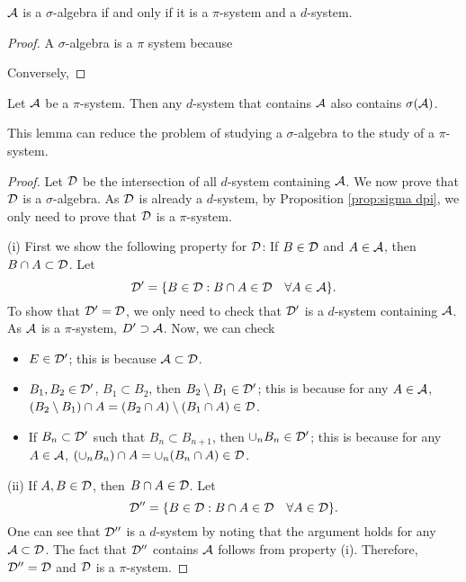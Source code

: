 \begin{proposition}\label{prop:sigma dpi}
    $\mathcal{A}$ is a $\sigma$-algebra if and only if it is a $\pi$-system and a $d$-system.
\end{proposition}
\begin{proof}
    A $\sigma$-algebra is a $\pi$ system because

    Conversely, 
\end{proof}

\begin{lemma}
    Let $\mathcal{A}$ be a $\pi$-system. Then any $d$-system that contains $\mathcal{A}$ also contains $\sigma(\mathcal{A})$.
\end{lemma}
This lemma can reduce the problem of studying a $\sigma$-algebra to the study of a $\pi$-system.
\begin{proof}
    Let $\mathcal{D}$ be the intersection of all $d$-system containing $\mathcal{A}$.
    We now prove that $\mathcal{D}$ is a $\sigma$-algebra. 
    As $\mathcal{D}$ is already a $d$-system, by Proposition \ref{prop:sigma dpi}, we only need to prove that $\mathcal{D}$ is a $\pi$-system.

    (i) First we show the following property for $\mathcal{D}$: If $B\in\mathcal{D}$ and $A\in\mathcal{A}$, then $B\cap A\subset\mathcal{D}$.
    Let $$\mathcal{D}'=\{B\in\mathcal{D}:B\cap A\in \mathcal{D}\quad \forall A\in\mathcal{A}\}.$$ 
    To show that $\mathcal{D}'=\mathcal{D}$, we only need to check that $\mathcal{D}'$ is a $d$-system containing $\mathcal{A}$.
    As $\mathcal{A}$ is a $\pi$-system, $D'\supset \mathcal{A}$. 
    Now, we can check
    \begin{itemize}
        \item $E\in\mathcal{D}'$; this is because $\mathcal{A}\subset\mathcal{D}$.
        \item $B_1,B_2\in\mathcal{D}'$, $B_1\subset B_2$, then $B_2\setminus B_1 \in\mathcal{D}'$; this is because for any $A\in\mathcal{A}$, $(B_2\setminus B_1)\cap A = (B_2\cap A)\setminus (B_1\cap A ) \in\mathcal{D}$.
        \item If $B_n\subset \mathcal{D}'$ such that $B_n\subset B_{n+1}$, then $\cup_{n}B_n\in\mathcal{D}'$; this is because for any $A\in\mathcal{A}$, $(\cup_{n}B_n)\cap A=\cup_n (B_n\cap A)\in\mathcal{D}$.
    \end{itemize}

    (ii) If $A,B\in\mathcal{D}$, then $B\cap A\in\mathcal{D}$.
    Let $$\mathcal{D}''=\{B\in\mathcal{D}:B\cap A\in \mathcal{D}\quad \forall A\in\mathcal{D}\}.$$ One can see that $\mathcal{D}''$ is a $d$-system by noting that the argument holds for any $\mathcal{A}\subset\mathcal{D}$.
    The fact that $\mathcal{D}''$ contains $\mathcal{A}$ follows from property (i). Therefore, $\mathcal{D}''=\mathcal{D}$ and $\mathcal{D}$ is a $\pi$-system.
\end{proof}


